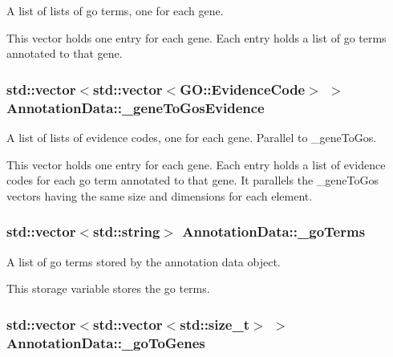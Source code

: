 A list of lists of go terms, one for each gene. 

This vector holds one entry for each gene. Each entry holds a list of go terms annotated to that gene. 
\subsubsection[{\texorpdfstring{\+\_\+gene\+To\+Gos\+Evidence}{_geneToGosEvidence}}]{\setlength{\rightskip}{0pt plus 5cm}std\+::vector$<$std\+::vector$<${\bf G\+O\+::\+Evidence\+Code}$>$ $>$ Annotation\+Data\+::\+\_\+gene\+To\+Gos\+Evidence}\hypertarget{classAnnotationData_a6bf6ba78c786caf078731b87357f96c0}{}\label{classAnnotationData_a6bf6ba78c786caf078731b87357f96c0}


A list of lists of evidence codes, one for each gene. Parallel to \+\_\+gene\+To\+Gos. 

This vector holds one entry for each gene. Each entry holds a list of evidence codes for each go term annotated to that gene. It parallels the \+\_\+gene\+To\+Gos vectors having the same size and dimensions for each element. 
\subsubsection[{\texorpdfstring{\+\_\+go\+Terms}{_goTerms}}]{\setlength{\rightskip}{0pt plus 5cm}std\+::vector$<$std\+::string$>$ Annotation\+Data\+::\+\_\+go\+Terms}\hypertarget{classAnnotationData_a88170d72e7addb555701e7aeba30f588}{}\label{classAnnotationData_a88170d72e7addb555701e7aeba30f588}


A list of go terms stored by the annotation data object. 

This storage variable stores the go terms. 
\subsubsection[{\texorpdfstring{\+\_\+go\+To\+Genes}{_goToGenes}}]{\setlength{\rightskip}{0pt plus 5cm}std\+::vector$<$std\+::vector$<$std\+::size\+\_\+t$>$ $>$ Annotation\+Data\+::\+\_\+go\+To\+Genes}\hypertarget{classAnnotationData_a72a19fdf14001e241bd0dc200c5fd0de}{}\label{classAnnotationData_a72a19fdf14001e241bd0dc200c5fd0de}



